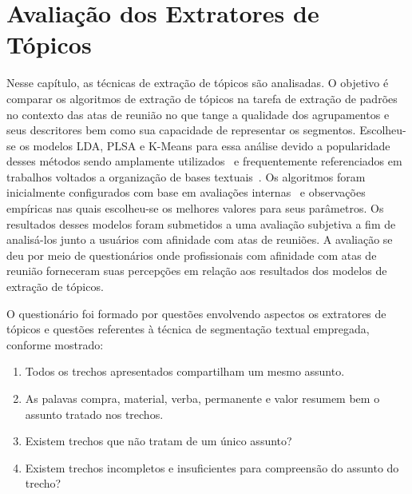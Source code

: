 \chapter{Avaliação dos Extratores de Tópicos}\label{cap-extratores}




Nesse capítulo, as técnicas de extração de tópicos são analisadas. O objetivo é comparar os algoritmos de extração de tópicos na tarefa de extração de padrões no contexto das atas de reunião no que tange a qualidade dos agrupamentos e seus descritores bem como sua capacidade de representar os segmentos. Escolheu-se os modelos LDA, PLSA e K-Means para essa análise devido a popularidade desses métodos sendo amplamente utilizados~\cite{DZhu20122} e frequentemente referenciados em trabalhos voltados a organização de bases textuais~\cite{Aggarwal2018, OCallaghan2015, Steyvers2007}.
Os algoritmos foram inicialmente configurados com base em avaliações internas~\cite{Hassani2017} e observações empíricas nas quais escolheu-se os melhores valores para seus parâmetros. Os resultados desses modelos foram submetidos a uma avaliação subjetiva a fim de analisá-los junto a usuários com afinidade com atas de reuniões. 
A avaliação se deu por meio de questionários onde profissionais com afinidade com atas de reunião forneceram suas percepções em relação aos resultados dos modelos de extração de tópicos. 




O questionário foi formado por questões envolvendo aspectos os extratores de tópicos e questões referentes à técnica de segmentação textual empregada, conforme mostrado:

\begin{enumerate}
	\item Todos os trechos apresentados compartilham um mesmo assunto.
	\item As palavas compra, material, verba, permanente e valor resumem bem o assunto tratado nos trechos.
	\item Existem trechos que não tratam de um único assunto?
	\item Existem trechos incompletos e insuficientes para compreensão do assunto do trecho?
\end{enumerate}


